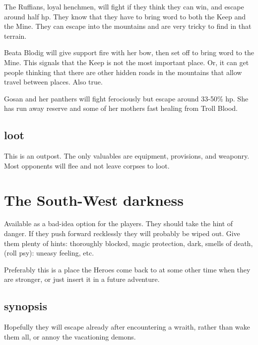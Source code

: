 The Ruffians, loyal henchmen, will fight if they think they can win, and escape around half hp. They know that they have to bring word to both the Keep and the Mine. They can escape into the mountains and are very tricky to find in that terrain.

Beata Blodig will give support fire with her bow, then set off to bring word to the Mine. This signals that the Keep is not the most important place. Or, it can get people thinking that there are other hidden roads in the mountains that allow travel between places. Also true.

Gosan and her panthers will fight ferociously but escape around 33-50\% hp. She has run away reserve and some of her mothers fast healing from Troll Blood.


\subsection*{loot}
This is an outpost. The only valuables are equipment, provisions, and weaponry. Most opponents will flee and not leave corpses to loot.









\section*{The South-West darkness}
Available as a bad-idea option for the players. They should take the hint of danger. If they push forward recklessly they will probably be wiped out. Give them plenty of hints: thoroughly blocked, magic protection, dark, smells of death, (roll psy): uneasy feeling, etc.

Preferably this is a place the Heroes come back to at some other time when they are stronger, or just insert it in a future adventure.


\subsection*{synopsis}
Hopefully they will escape already after encountering a wraith, rather than wake them all, or annoy the vacationing demons.


